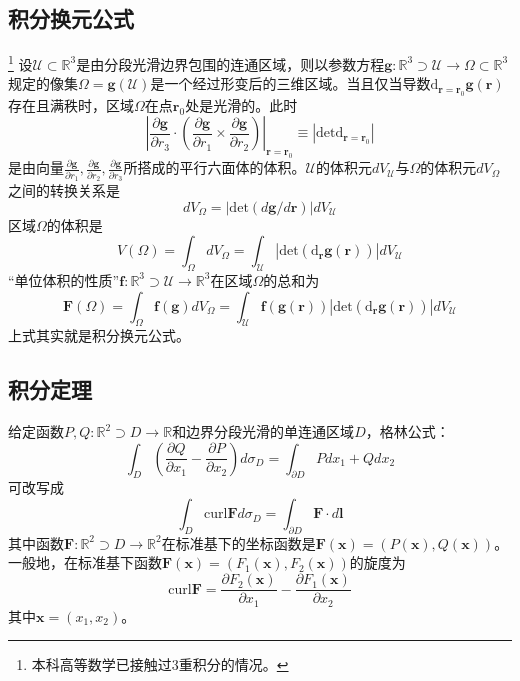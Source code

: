 \documentclass[main.tex]{subfiles}
\begin{document}
\subsection{积分换元公式}\footnote{本科高等数学已接触过3重积分的情况\cite[\S 8.3“五”]{华工高数2009下}。}
设$\mathcal{U}\subset\mathbb{R}^3$是由分段光滑边界包围的连通区域，则以参数方程$\mathbf{g}:\mathbb{R}^3\supset \mathcal{U}\rightarrow\Omega\subset\mathbb{R}^3$规定的像集$\Omega=\mathbf{g}\left(\mathcal{U}\right)$是一个经过形变后的三维区域。当且仅当导数$\mathrm{d}_{\mathbf{r}=\mathbf{r}_0}\mathbf{g}\left(\mathbf{r}\right)$存在且满秩时，区域$\Omega$在点$\mathbf{r}_0$处是光滑的。此时
\[
    \left|\frac{\partial \mathbf{g}}{\partial r_3}\cdot\left(\frac{\partial\mathbf{g}}{\partial r_1}\times\frac{\partial\mathbf{g}}{\partial r_2}\right)\right|_{\mathbf{r}=\mathbf{r}_0}\equiv\left|\mathrm{det}\mathrm{d}_{\mathbf{r}=\mathbf{r}_0}\right|
\]
是由向量$\frac{\partial\mathbf{g}}{\partial r_1},\frac{\partial\mathbf{g}}{\partial r_2},\frac{\partial\mathbf{g}}{\partial r_3}$所搭成的平行六面体的体积。$\mathcal{U}$的体积元$dV_\mathcal{U}$与$\Omega$的体积元$dV_\Omega$之间的转换关系是
\[dV_\Omega=\left|\mathrm{det}\left(d\mathbf{g}/d\mathbf{r}\right)\right|
    dV_\mathcal{U}\]
区域$\Omega$的体积是
\[
    V\left(\Omega\right)=\int_\Omega dV_\Omega=\int_\mathcal{U}\left|\mathrm{det}\left(\mathrm{d}_{\mathbf{r}}\mathbf{g}\left(\mathbf{r}\right)\right)\right|dV_\mathcal{U}
\]
“单位体积的性质”$\mathbf{f}:\mathbb{R}^3\supset\mathcal{U}\rightarrow\mathbb{R}^3$在区域$\Omega$的总和为
\[
    \mathbf{F}\left(\Omega\right)=\int_\Omega\mathbf{f}\left(\mathbf{g}\right)dV_\Omega=\int_\mathcal{U}\mathbf{f}\left(\mathbf{g}\left(\mathbf{r}\right)\right)\left|\mathrm{det}\left(\mathrm{d}_{\mathbf{r}}\mathbf{g}\left(\mathbf{r}\right)\right)\right|dV_\mathcal{U}
\]
上式其实就是积分换元公式。

\subsection{积分定理}
给定函数$P,Q:\mathbb{R}^2\supset D\rightarrow\mathbb{R}$和边界分段光滑的单连通区域$D$，格林公式：
\[\int_D\left(\frac{\partial Q}{\partial x_1}-\frac{\partial P}{\partial x_2}\right)d\sigma_D=\int_{\partial D}Pdx_1+Qdx_2
\]
可改写成
\[
    \int_D\mathrm{curl}\mathbf{F}d\sigma_D=\int_{\partial D}\mathbf{F}\cdot d\mathbf{l}
\]
其中函数$\mathbf{F}:\mathbb{R}^2\supset D\rightarrow\mathbb{R}^2$在标准基下的坐标函数是$\mathbf{F}\left(\mathbf{x}\right)=\left(P\left(\mathbf{x}\right),Q\left(\mathbf{x}\right)\right)$。一般地，在标准基下函数$\mathbf{F}\left(\mathbf{x}\right)=\left(F_1\left(\mathbf{x}\right),F_2\left(\mathbf{x}\right)\right)$的旋度为
\[\mathrm{curl}\mathbf{F}=\frac{\partial F_2\left(\mathbf{x}\right)}{\partial x_1}-\frac{\partial F_1\left(\mathbf{x}\right)}{\partial x_2}\]
其中$\mathbf{x}=\left(x_1,x_2\right)$。
\end{document}
